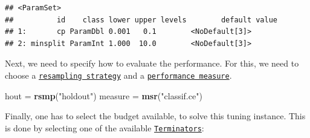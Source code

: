 \documentclass[]{scrbook}
\newenvironment{Shaded}{\begin{snugshade}}{\end{snugshade}}
\newcommand{\DataTypeTok}[1]{\textcolor[rgb]{0.13,0.29,0.53}{#1}}
\newcommand{\DecValTok}[1]{\textcolor[rgb]{0.00,0.00,0.81}{#1}}
\newcommand{\FloatTok}[1]{\textcolor[rgb]{0.00,0.00,0.81}{#1}}
\newcommand{\KeywordTok}[1]{\textcolor[rgb]{0.13,0.29,0.53}{\textbf{#1}}}
\newcommand{\NormalTok}[1]{#1}
\newcommand{\OperatorTok}[1]{\textcolor[rgb]{0.81,0.36,0.00}{\textbf{#1}}}
\newcommand{\StringTok}[1]{\textcolor[rgb]{0.31,0.60,0.02}{#1}}
\renewenvironment{Shaded} {\begin{snugshade}\small} {\end{snugshade}}
\begin{document}
\begin{Shaded}
\end{Shaded}

\begin{verbatim}
## <ParamSet>
##          id    class lower upper levels        default value
## 1:       cp ParamDbl 0.001   0.1        <NoDefault[3]>      
## 2: minsplit ParamInt 1.000  10.0        <NoDefault[3]>
\end{verbatim}

Next, we need to specify how to evaluate the performance.
For this, we need to choose a \href{https://mlr3.mlr-org.com/reference/Resampling.html}{\texttt{resampling\ strategy}} and a \href{https://mlr3.mlr-org.com/reference/Measure.html}{\texttt{performance\ measure}}.

\begin{Shaded}
\begin{Highlighting}[]
\NormalTok{hout =}\StringTok{ }\KeywordTok{rsmp}\NormalTok{(}\StringTok{"holdout"}\NormalTok{)}
\NormalTok{measure =}\StringTok{ }\KeywordTok{msr}\NormalTok{(}\StringTok{"classif.ce"}\NormalTok{)}
\end{Highlighting}
\end{Shaded}

Finally, one has to select the budget available, to solve this tuning instance.
This is done by selecting one of the available \href{https://bbotk.mlr-org.com/reference/Terminator.html}{\texttt{Terminators}}:
\end{document}
